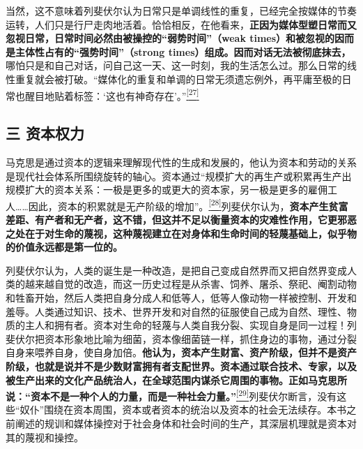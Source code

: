 \documentclass[UTF8, fontset = sourcesans, a4paper, oneside, zihao =
-4, scheme=chinese, no-math, space=true]{ctexbook}
\begin{document}
当然，这不意味着列斐伏尔认为日常只是单调线性的重复，已经完全按媒体的节奏运转，人们只是行尸走肉地活着。恰恰相反，在他看来，\textbf{正因为媒体型塑日常而又忽视日常，日常时间必然由被操控的``弱势时间''（weak
times）和被忽视的因而是主体性占有的``强势时间''（strong
times）组成。因而对话无法被彻底抹去，}哪怕只是和自己对话，问自己这一天、这一时刻，我的生活怎么过。那么日常的线性重复就会被打破。``媒体化的重复和单调的日常无须遗忘例外，再平庸至极的日常也醒目地贴着标签：`这也有神奇存在'。''\protect\hypertarget{part0009_split_003.htmlux5cux23w27}{}{}\protect\hyperlink{part0009_split_004.htmlux5cux23m27}{\textsuperscript{{[}27{]}}}

\subsection{三 资本权力}\label{part0009_split_003.htmlux5cux23c052}

马克思是通过资本的逻辑来理解现代性的生成和发展的，他认为资本和劳动的关系是现代社会体系所围绕旋转的轴心。资本通过``规模扩大的再生产或积累再生产出规模扩大的资本关系：一极是更多的或更大的资本家，另一极是更多的雇佣工人……因此，资本的积累就是无产阶级的增加''。\protect\hypertarget{part0009_split_003.htmlux5cux23w28}{}{}\protect\hyperlink{part0009_split_004.htmlux5cux23m28}{\textsuperscript{{[}28{]}}}列斐伏尔认为，\textbf{资本产生贫富差距、有产者和无产者，这不错，但这并不足以衡量资本的灾难性作用，它更邪恶之处在于对生命的蔑视，这种蔑视建立在对身体和生命时间的轻蔑基础上，似乎物的价值永远都是第一位的。}

列斐伏尔认为，人类的诞生是一种改造，是把自己变成自然界而又把自然界变成人类的越来越自觉的改造，而这一历史过程是从杀害、饲养、屠杀、祭祀、阉割动物和牲畜开始，然后人类把自身分成人和低等人，低等人像动物一样被控制、开发和羞辱。人类通过知识、技术、世界开发和对自然的征服使自己成为自然、理性、物质的主人和拥有者。资本对生命的轻蔑与人类自我分裂、实现自身是同一过程！列斐伏尔把资本形象地比喻为细菌，资本像细菌链一样，抓住身边的事物，通过分裂自身来喂养自身，使自身加倍。\textbf{他认为，资本产生财富、资产阶级，但并不是资产阶级，也就是说并不是少数财富拥有者支配世界。资本通过联合技术、专家，以及被生产出来的文化产品统治人，在全球范围内谋杀它周围的事物。正如马克思所说：``资本不是一种个人的力量，而是一种社会力量。''}\protect\hypertarget{part0009_split_003.htmlux5cux23w29}{}{}\protect\hyperlink{part0009_split_004.htmlux5cux23m29}{\textsuperscript{{[}29{]}}}列斐伏尔断言，没有这些``奴仆''围绕在资本周围，资本或者资本的统治以及资本的社会无法续存。本书之前阐述的规训和媒体操控对于社会身体和社会时间的生产，其深层机理就是资本对其的蔑视和操控。
\end{document}
